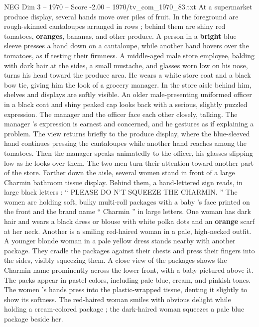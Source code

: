 \begin{textsample}{NEG Dim 3 – 1970 – Score -2.00 – 1970/tv\_com\_1970\_83.txt}  \label{ex:f3_neg_067}
At a supermarket produce display, several hands move over piles of fruit.
In the foreground are rough-skinned cantaloupes arranged in rows ; behind them are shiny red tomatoes, \textbf{oranges}, bananas, and other produce.
A person in a \textbf{bright} blue sleeve presses a hand down on a cantaloupe, while another hand hovers over the tomatoes, as if testing their firmness.
A middle-aged male store employee, balding with dark hair at the sides, a small mustache, and glasses worn low on his nose, turns his head toward the produce area.
He wears a white store coat and a black bow tie, giving him the look of a grocery manager.
In the store aisle behind him, shelves and displays are softly visible.
An older male-presenting uniformed officer in a black coat and shiny peaked cap looks back with a serious, slightly puzzled expression.
The manager and the officer face each other closely, talking.
The manager ’s expression is earnest and concerned, and he gestures as if explaining a problem.
The view returns briefly to the produce display, where the blue-sleeved hand continues pressing the cantaloupes while another hand reaches among the tomatoes.
Then the manager speaks animatedly to the officer, his glasses slipping low as he looks over them.
The two men turn their attention toward another part of the store.
Farther down the aisle, several women stand in front of a large Charmin bathroom tissue display.
Behind them, a hand-lettered sign reads, in large black letters : “ PLEASE DO N’T SQUEEZE THE CHARMIN. ” The women are holding soft, bulky multi-roll packages with a baby ’s face printed on the front and the brand name “ Charmin ” in large letters.
One woman has dark hair and wears a black dress or blouse with white polka dots and an \textbf{orange} scarf at her neck.
Another is a smiling red-haired woman in a pale, high-necked outfit.
A younger blonde woman in a pale yellow dress stands nearby with another package.
They cradle the packages against their chests and press their fingers into the sides, visibly squeezing them.
A close view of the packages shows the Charmin name prominently across the lower front, with a baby pictured above it.
The packs appear in pastel colors, including pale blue, cream, and pinkish tones.
The women ’s hands press into the plastic-wrapped tissue, denting it slightly to show its softness.
The red-haired woman smiles with obvious delight while holding a cream-colored package ; the dark-haired woman squeezes a pale blue package beside her.

\end{textsample}
